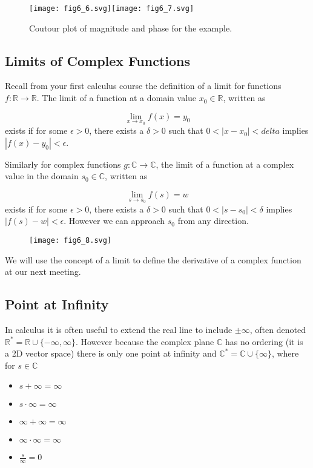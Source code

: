 \documentclass{article}
\begin{document}
\begin{figure}
  \centering
  \texttt{[image: fig6\_6.svg]}\texttt{[image: fig6\_7.svg]}
  \caption{Coutour plot of magnitude and phase for the example.}
\end{figure}


\subsection{Limits of Complex Functions}

Recall from your first calculus course the definition of a limit for functions $f:\mathbb{R}\rightarrow\mathbb{R}$. The limit of a function at a domain value $x_0\in\mathbb{R}$, written as

\[
\lim_{x \rightarrow x_0} f(x) = y_0 
\]
exists if for some $\epsilon > 0$, there exists a $\delta > 0$ such that
$0 < |x-x_0| < delta$ implies $|f(x) - y_0| < \epsilon$.

Similarly for complex functions $g:\mathbb{C}\rightarrow\mathbb{C}$, the 
limit of a function at a complex value in the domain $s_0\in\mathbb{C}$, written as

\[
\lim_{s \rightarrow s_0} f(s) = w 
\]
exists if for some $\epsilon > 0$, there exists a $\delta > 0$ such that
$0 < |s-s_0| < \delta$ implies $|f(s) - w| < \epsilon$. However we can approach $s_0$ from any direction.

\begin{figure}
  \centering
  \texttt{[image: fig6\_8.svg]}
\end{figure}

We will use the concept of a limit to define the derivative of a complex function at our next meeting.

\subsection{Point at Infinity}

In calculus it is often useful to extend the real line to include $\pm\infty$, often denoted $\mathbb{R}^* = \mathbb{R} \cup \{-\infty, \infty\}$. However because the complex plane $\mathbb{C}$ has no ordering (it is a 2D vector space) there is only one point at infinity and $\mathbb{C}^* = \mathbb{C} \cup \{\infty\}$, where for $s\in\mathbb{C}$

\begin{itemize}
\item $s + \infty = \infty$
\item $s \cdot \infty = \infty$
\item $\infty + \infty = \infty$
\item $\infty \cdot \infty = \infty$
\item $\frac{s}{\infty} = 0$
\end{itemize}
\end{document}
